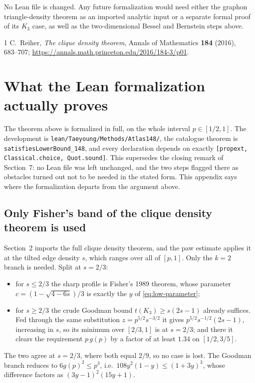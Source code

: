 \documentclass[11pt]{article}
\begin{document}
No Lean file is changed.  Any future formalization would need either the
graphon triangle-density theorem as an imported analytic input or a separate
formal proof of its $K_3$ case, as well as the two-dimensional Bessel and
Bernstein steps above.

\begin{thebibliography}{1}
C.~Reiher,
\emph{The clique density theorem},
Annals of Mathematics \textbf{184} (2016), 683--707;
\url{https://annals.math.princeton.edu/2016/184-3/p01}.
\end{thebibliography}


\appendix
\section{What the Lean formalization actually proves}

The theorem above is formalized in full, on the whole interval $p\in[1/2,1]$.
The development is \texttt{lean/Taeyoung/Methods/Atlas148/}, the catalogue
theorem is \texttt{satisfiesLowerBound\_148}, and every declaration depends on
exactly \texttt{[propext, Classical.choice, Quot.sound]}.  This supersedes the
closing remark of Section~7: no Lean file was left unchanged, and the two
steps flagged there as obstacles turned out not to be needed in the stated
form.  This appendix says where the formalization departs from the argument
above.

\subsection{Only Fisher's band of the clique density theorem is used}
\label{sec:app148-fisher}

Section~2 imports the full clique density theorem, and the paw estimate applies
it at the tilted edge density $s$, which ranges over all of $[p,1]$.  Only the
$k=2$ branch is needed.  Split at $s=2/3$:

\begin{itemize}
 \item for $s\leq2/3$ the sharp profile is Fisher's 1989 theorem, whose
 parameter $c=(1-\sqrt{4-6s})/3$ is exactly the $y$ of
 \eqref{eq:low-parameter};
 \item for $s\geq2/3$ the crude Goodman bound $t(K_3)\geq s(2s-1)$ already
 suffices.  Fed through the same substitution $z=p^{5/2}s^{-3/2}$ it gives
 $p^{5/2}s^{-1/2}(2s-1)$, increasing in $s$, so its minimum over $[2/3,1]$ is
 at $s=2/3$; and there it clears the requirement $p\,g(p)$ by a factor of at
 least $1.34$ on $[1/2,3/5]$.
\end{itemize}
The two agree at $s=2/3$, where both equal $2/9$, so no case is lost.  The
Goodman branch reduces to $6g(p)^2\leq p^3$, i.e.\ $108y^2(1-y)\leq(1+3y)^3$,
whose difference factors as $(3y-1)^2(15y+1)$.
\end{document}
